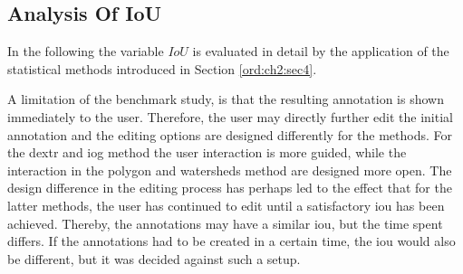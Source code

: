 \begin{table}[h!]
	\centering
	\caption[Correlation table]{
		Correlation table based on the \textit{Pearson} standard correlation coefficient \cite{Kirch08-CorrPearson}.
		The redundant part of the table is left empty. 
		The variables $ n_{clicks} $, $ n_{strokes} $, $ time_{strokes} $, and $ ws $ all show a intermediate correlation with $ time_{annot} $, while their combination $ cws $ shows a strong correlation with $ 0.8610 $. 
		The correlation between $ IoU $ and $ time_{annot} $ indicates almost not relationship $ 0.0379 $.
	}\label{tab:ch5:correlation-matrix}
\end{table}


\subsection{Analysis Of IoU}\label{ord:ch5:sec1:subsec2}

In the following the variable $IoU$ is evaluated in detail by the application of the statistical methods introduced in Section \ref{ord:ch2:sec4}.

A limitation of the benchmark study, is that the resulting annotation is shown immediately to the user.
Therefore, the user may directly further edit the initial annotation and the editing options are designed differently for the methods.
For the \gls{dextr} and \gls{iog} method the user interaction is more guided, while the interaction in the polygon and watersheds method are designed more open.
The design difference in the editing process has perhaps led to the effect that for the latter methods, the user has continued to edit until a satisfactory \gls{iou} has been achieved.
Thereby, the annotations may have a similar \gls{iou}, but the time spent differs.
If the annotations had to be created in a certain time, the \gls{iou} would also be different, but it was decided against such a setup.

